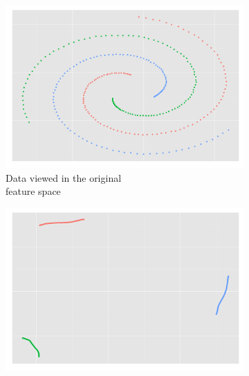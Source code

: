 \begin{figure}[h!]
  \centering
  \begin{subfigure}{0.4\textwidth}
    \centering
    \includegraphics[width = \textwidth, height = \textwidth]{code_embedding/3_spiral_original.png}
    \caption{Data viewed in the original \\ feature space}
  \label{fig:spirals_original}
  \end{subfigure}
  \begin{subfigure}{0.4\textwidth}
    \centering
    \includegraphics[width =\textwidth, height = \textwidth]{code_embedding/3_spiral_embedded.png}

\end{subfigure}
\end{figure}
